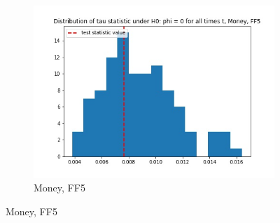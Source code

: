 \documentclass{article}
\begin{document}
\begin{figure}
\begin{subfigure}[b]{0.3\textwidth}
    \includegraphics[width=\textwidth]{Money/tau_hist_02_FF5.jpg}
    \caption{Money, FF5}
    \label{fig:2}
  \end{subfigure}
  \end{figure}
\end{document}
